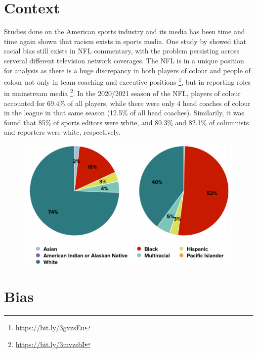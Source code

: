 \documentclass[oneside,12pt]{Classes/RoboticsLaTeX}
\begin{document}
\section{Context}
Studies done on the American sports industry and its media has been time and time again shown that racism exists in sports media. One study by \citet{Viklund2009}
showed that racial bias still exists in NFL commentary, with the problem persisting across serveral different television network coverages.
The NFL is in a unique position for analysis as there is a huge
discrepancy in both players of colour and people of colour not only in team coaching and executive positions \footnote{\url{https://bit.ly/3gxzsEu}}, but in
reporting roles in mainstream media \footnote{\url{https://bit.ly/3mvzsbI}}. In the 2020/2021 season of the NFL, players of colour accounted for 69.4\% of 
all players, while there were only 4 head coaches of colour in the league in that same season (12.5\% of all head coaches). Similarily, it was found that 85\% 
of sports editors were white, and 80.3\% and 82.1\% of columnists and reporters were white, respectively.

\begin{figure}[hb]
  \centering
  \begin{minipage}{1\textwidth}
    \centering
    \includegraphics[width=1\linewidth]{Figures/Female_Enrolled_v_Disciplined.png}
    \label{fig:Female_Rep}
  \end{minipage}%
\end{figure}


\section{Bias}
\end{document}

